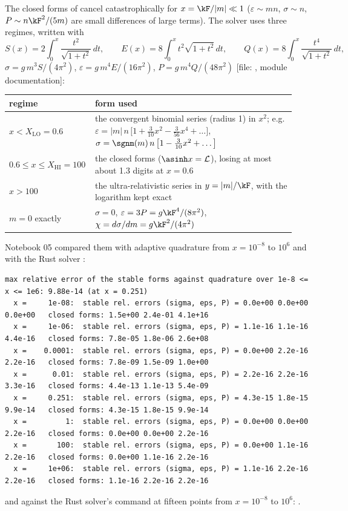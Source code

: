 The closed forms of  cancel catastrophically for $x=\kF/|m|\ll1$ ($\varepsilon\sim mn$,
$\sigma\sim n$, $P\sim n\kF^2/(5m)$ are small differences of large terms). The solver uses three regimes,
written with
\[
  S(x)=2\int_0^x\frac{t^2}{\sqrt{1+t^2}}\,dt,\qquad E(x)=8\int_0^xt^2\sqrt{1+t^2}\,dt,\qquad
  Q(x)=8\int_0^x\frac{t^4}{\sqrt{1+t^2}}\,dt,
\]
$\sigma=g\,m^3S/(4\pi^2)$, $\varepsilon=g\,m^4E/(16\pi^2)$, $P=g\,m^4Q/(48\pi^2)$ [file:
, module documentation]:
\begin{center}
\small
\renewcommand{\arraystretch}{1.3}
\begin{tabular}{@{}>{\raggedright\arraybackslash}p{0.25\linewidth}>{\raggedright\arraybackslash}p{0.69\linewidth}@{}}
\toprule
regime & form used\\
\midrule
$x<X_{\mathrm{LO}}=0.6$ & the convergent binomial series (radius 1) in $x^2$; e.g.
$\varepsilon=|m|\,n\,\bigl[1+\tfrac{3}{10}x^2-\tfrac{3}{56}x^4+\dots\bigr]$,
$\sigma=\sgnm(m)\,n\,\bigl[1-\tfrac{3}{10}x^2+\dots\bigr]$\\
$0.6\leq x\leq X_{\mathrm{HI}}=100$ & the closed forms ($\asinh x=\mathcal L$), losing at most about 1.3
digits at $x=0.6$\\
$x>100$ & the ultra-relativistic series in $y=|m|/\kF$, with the logarithm kept exact\\
$m=0$ exactly & $\sigma=0$, $\varepsilon=3P=g\kF^4/(8\pi^2)$, $\chi=d\sigma/dm=g\kF^2/(4\pi^2)$\\
\bottomrule
\end{tabular}
\end{center}
Notebook 05 compared them with adaptive quadrature from $x=10^{-8}$ to $10^{6}$ and with the Rust solver
:
\begin{Verbatim}[fontsize=\scriptsize]
max relative error of the stable forms against quadrature over 1e-8 <= x <= 1e6: 9.88e-14 (at x = 0.251)
  x =     1e-08:  stable rel. errors (sigma, eps, P) = 0.0e+00 0.0e+00 0.0e+00   closed forms: 1.5e+00 2.4e-01 4.1e+16
  x =     1e-06:  stable rel. errors (sigma, eps, P) = 1.1e-16 1.1e-16 4.4e-16   closed forms: 7.8e-05 1.8e-06 2.6e+08
  x =    0.0001:  stable rel. errors (sigma, eps, P) = 0.0e+00 2.2e-16 2.2e-16   closed forms: 7.8e-09 1.5e-09 1.0e+00
  x =      0.01:  stable rel. errors (sigma, eps, P) = 2.2e-16 2.2e-16 3.3e-16   closed forms: 4.4e-13 1.1e-13 5.4e-09
  x =     0.251:  stable rel. errors (sigma, eps, P) = 4.3e-15 1.8e-15 9.9e-14   closed forms: 4.3e-15 1.8e-15 9.9e-14
  x =         1:  stable rel. errors (sigma, eps, P) = 0.0e+00 0.0e+00 2.2e-16   closed forms: 0.0e+00 0.0e+00 2.2e-16
  x =       100:  stable rel. errors (sigma, eps, P) = 0.0e+00 1.1e-16 2.2e-16   closed forms: 0.0e+00 1.1e-16 2.2e-16
  x =     1e+06:  stable rel. errors (sigma, eps, P) = 1.1e-16 2.2e-16 2.2e-16   closed forms: 1.1e-16 2.2e-16 2.2e-16
\end{Verbatim}
and against the Rust solver's  command at fifteen points from $x=10^{-8}$ to $10^{6}$:
.

